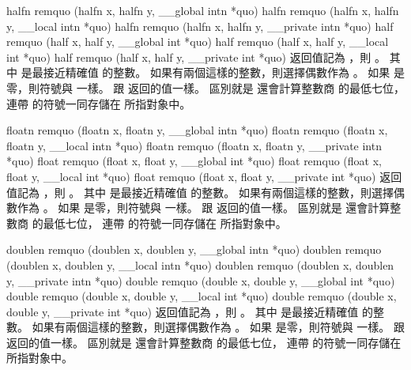 halfn remquo (halfn x,
	halfn y,
	__global intn *quo)
halfn remquo (halfn x,
	halfn y,
	__local intn *quo)
halfn remquo (halfn x,
	halfn y,
	__private intn *quo)
half remquo (half x,
	half y,
	__global int *quo)
half remquo (half x,
	half y,
	__local int *quo)
half remquo (half x,
	half y,
	__private int *quo)
\stopbuffer
{}
返回值記為 ，則 。
其中  是最接近精確值  的整數。
如果有兩個這樣的整數，則選擇偶數作為 。
如果  是零，則符號與  一樣。
 跟  返回的值一樣。
區別就是  還會計算整數商  的最低七位，
連帶  的符號一同存儲在  所指對象中。
\stopbuffer

floatn remquo (floatn x,
	floatn y,
	__global intn *quo)
floatn remquo (floatn x,
	floatn y,
	__local intn *quo)
floatn remquo (floatn x,
	floatn y,
	__private intn *quo)
float remquo (float x,
	float y,
	__global int *quo)
float remquo (float x,
	float y,
	__local int *quo)
float remquo (float x,
	float y,
	__private int *quo)
\stopbuffer
{}
返回值記為 ，則 。
其中  是最接近精確值  的整數。
如果有兩個這樣的整數，則選擇偶數作為 。
如果  是零，則符號與  一樣。
 跟  返回的值一樣。
區別就是  還會計算整數商  的最低七位，
連帶  的符號一同存儲在  所指對象中。
\stopbuffer

doublen remquo (doublen x,
	doublen y,
	__global intn *quo)
doublen remquo (doublen x,
	doublen y,
	__local intn *quo)
doublen remquo (doublen x,
	doublen y,
	__private intn *quo)
double remquo (double x,
	double y,
	__global int *quo)
double remquo (double x,
	double y,
	__local int *quo)
double remquo (double x,
	double y,
	__private int *quo)
\stopbuffer
{}
返回值記為 ，則 。
其中  是最接近精確值  的整數。
如果有兩個這樣的整數，則選擇偶數作為 。
如果  是零，則符號與  一樣。
 跟  返回的值一樣。
區別就是  還會計算整數商  的最低七位，
連帶  的符號一同存儲在  所指對象中。
\stopbuffer

